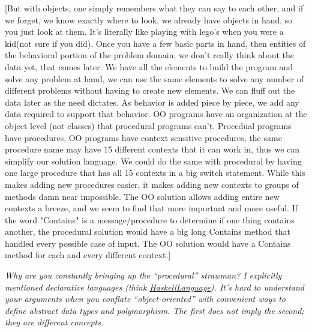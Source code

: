 \documentclass[10pt,twoside,openright]{memoir}
\begin{document}
[But with objects, one simply remembers what they can say to each other, and if we forget, we know exactly where to look, we already have objects in hand, so you just look at them. It's literally like playing with lego's when you were a kid(not sure if you did). Once you have a few basic parts in hand, then entities of the behavioral portion of the problem domain, we don't really think about the data yet, that comes later. We have all the elements to build the program and solve any problem at hand, we can use the same elements to solve any number of different problems without having to create new elements. We can fluff out the data later as the need dictates. As behavior is added piece by piece, we add any data required to support that behavior. OO programs have an organization at the object level (not classes) that procedural programs can't. Procedual programs have procedures, OO programs have context sensitive procedures, the same procedure name may have 15 different contexts that it can work in, thus we can simplify our solution language. We could do the same with procedural by having one large procedure that has all 15 contexts in a big switch statement. While this makes adding new procedures easier, it makes adding new contexts to groups of methods damn near impossible. The OO solution allows adding entire new contexts a breeze, and we seem to find that more important and more useful. If the word "Contains" is a message/procedure to determine if one thing contains another, the procedural solution would have a big long Contains method that handled every possible case of input. The OO solution would have a Contains method for each and every different context.]

\emph{Why are you constantly bringing up the ``procedural'' strawman? I explicitly mentioned declarative languages (think \ul{HaskellLanguage}). It's hard to understand your arguments when you conflate ``object-oriented'' with convenient ways to define abstract data types and polymorphism. The first does not imply the second; they are different concepts.}
\end{document}
